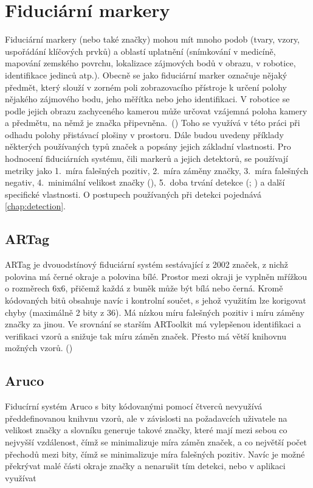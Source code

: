  \section{Fiduciární markery} \label{sec:fidu}
    Fiduciární markery (nebo také značky) mohou mít mnoho podob (tvary, vzory, uspořádání klíčových prvků) a oblastí uplatnění (snímkování v medicíně, mapování zemského povrchu, lokalizace zájmových bodů v obrazu, v robotice, identifikace jedinců atp.). Obecně se jako fiduciární marker označuje nějaký předmět, který slouží v zorném poli zobrazovacího přístroje k určení polohy nějakého zájmového bodu, jeho měřítka nebo jeho identifikaci. V robotice se podle jejich obrazu zachyceného kamerou může určovat vzájemná poloha kamery a předmětu, na němž je značka připevněna.~(\cite{kostak:fidmark}) Toho se využívá v této práci při odhadu polohy přistávací plošiny v prostoru. Dále budou uvedeny příklady některých používaných typů značek a popsány jejich základní vlastnosti. Pro hodnocení fiduciárních systému, čili markerů a jejich detektorů, se používají metriky jako 1.~míra falešných pozitiv, 2.~míra záměny značky, 3.~míra falešných negativ, 4.~minimální velikost značky (\cite{artag}), 5.~doba trvání detekce (\cite{aruco}; \cite{apriltag2}) a další specifické vlastnosti. O postupech používaných při detekci pojednává \cref{chap:detection}.
    \subsection{ARTag}
      ARTag je dvouodstínový fiduciární systém sestávající z 2002 značek, z nichž polovina má černé okraje a polovina bílé. Prostor mezi okraji je vyplněn mřížkou o rozměrech 6x6, přičemž každá z buněk může být bílá nebo černá. Kromě kódovaných bitů obsahuje navíc i kontrolní součet, s jehož využitím lze korigovat chyby (maximálně 2 bity z 36). Má nízkou míru falešných pozitiv i míru záměny značky za jinou. Ve srovnání se starším ARToolkit má vylepšenou identifikaci a verifikaci vzorů a snižuje tak míru záměn značek. Přesto má větší knihovnu možných vzorů. (\cite{artag})
    \subsection{Aruco}
      Fiducírní systém Aruco s bity kódovanými pomocí čtverců nevyužívá předdefinovanou knihvnu vzorů, ale v závislosti na požadavcích uživatele na velikost značky a slovníku generuje takové značky, které mají mezi sebou co nejvyšší vzdálenost, čímž se minimalizuje míra záměn značek, a co největší počet přechodů mezi bity, čímž se minimalizuje míra falešných pozitiv. Navíc je možné překrývat malé části okraje značky a nenarušit tím detekci, nebo v aplikaci využívat
